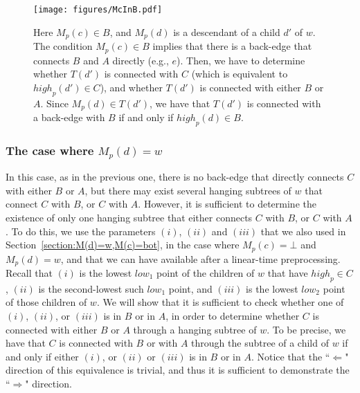 \documentclass[11pt,a4paper]{article}
\begin{document}
\begin{figure}[h!]\centering
\texttt{[image: figures/McInB.pdf]}
\caption{\small{Here $M_p(c)\in B$, and $M_p(d)$ is a descendant of a child $d'$ of $w$. The condition $M_p(c)\in B$ implies that there is a back-edge that connects $B$ and $A$ directly (e.g., $e$). Then, we have to determine whether $T(d')$ is connected with $C$ (which is equivalent to $\mathit{high}_p(d')\in C$), and whether $T(d')$ is connected with either $B$ or $A$. Since $M_p(d)\in T(d')$, we have that $T(d')$ is connected with a back-edge with $B$ if and only if $\mathit{high}_p(d)\in B$.}}\label{figure:McInB}
\end{figure} 

\subsubsection{The case where $M_p(d)=w$}
In this case, as in the previous one, there is no back-edge that directly connects $C$ with either $B$ or $A$, but there may exist several hanging subtrees of $w$ that  connect $C$ with $B$, or $C$ with $A$. However, it is sufficient to determine the existence of only one hanging subtree that either connects $C$ with $B$, or $C$ with $A$. To do this, we use the parameters $(i)$, $(ii)$ and $(iii)$ that we also used in Section~\ref{section:M(d)=w,M(c)=bot}, in the case where $M_p(c)=\bot$ and $M_p(d)=w$, and that we can have available after a linear-time preprocessing. Recall that $(i)$ is the lowest $\mathit{low}_1$ point of the children of $w$ that have $\mathit{high}_p\in C$, $(ii)$ is the second-lowest such $\mathit{low}_1$ point, and $(iii)$ is the lowest $\mathit{low}_2$ point of those children of $w$. We will show that it is sufficient to check whether one of $(i)$, $(ii)$, or $(iii)$ is in $B$ or in $A$, in order to determine whether $C$ is connected with either $B$ or $A$ through a hanging subtree of $w$. To be precise, we have that $C$ is connected with $B$ or with $A$ through the subtree of a child of $w$ if and only if either $(i)$, or $(ii)$ or $(iii)$ is in $B$ or in $A$. Notice that the ``$\Leftarrow$" direction of this equivalence is trivial, and thus it is sufficient to demonstrate the ``$\Rightarrow$" direction.
\end{document}
